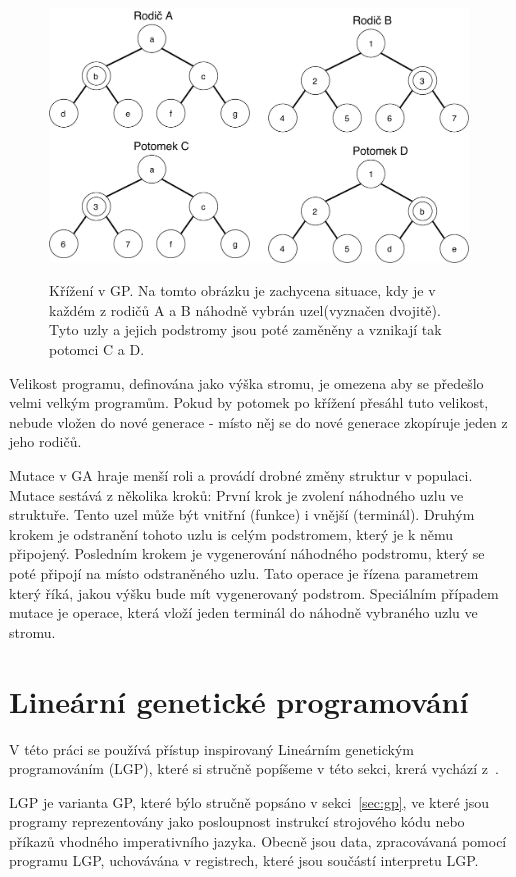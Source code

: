\begin{figure}[h]
    \centering
    {\includegraphics[width=30em]{obrazky/gp_krizeni.pdf}}
    \caption{
    Křížení v GP.
    Na tomto obrázku je zachycena situace, kdy je v každém z rodičů A a B náhodně vybrán uzel(vyznačen dvojitě).
    Tyto uzly a jejich podstromy jsou poté zaměněny a vznikají tak potomci C a D.
    }
    \label{fig:GP_krizeni}
\end{figure}

Velikost programu, definována jako výška stromu, je omezena aby se předešlo velmi velkým programům.
Pokud by potomek po křížení přesáhl tuto velikost, nebude vložen do nové generace - místo něj se do nové generace zkopíruje jeden z jeho rodičů.

Mutace v GA hraje menší roli a provádí drobné změny struktur v populaci.
Mutace sestává z několika kroků:
První krok je zvolení náhodného uzlu ve struktuře.
Tento uzel může být vnitřní (funkce) i vnější (terminál).
Druhým krokem je odstranění tohoto uzlu is celým podstromem, který je k němu připojený.
Posledním krokem je vygenerování náhodného podstromu, který se poté připojí na místo odstraněného uzlu.
Tato operace je řízena parametrem který říká, jakou výšku bude mít vygenerovaný podstrom.
Speciálním případem mutace je operace, která vloží jeden terminál do náhodně vybraného uzlu ve stromu.

\section{Lineární genetické programování}
\label{sec:lgp}

V této práci se používá přístup inspirovaný Lineárním genetickým programováním (LGP), které si stručně popíšeme v této sekci, krerá vychází z~\cite{Brameier2010}.

LGP je varianta GP, které býlo stručně popsáno v sekci~\ref{sec:gp}, ve které jsou programy reprezentovány jako posloupnost instrukcí strojového kódu nebo příkazů vhodného imperativního jazyka.
Obecně jsou data, zpracovávaná pomocí programu LGP, uchovávána v registrech, které jsou součástí interpretu LGP.


